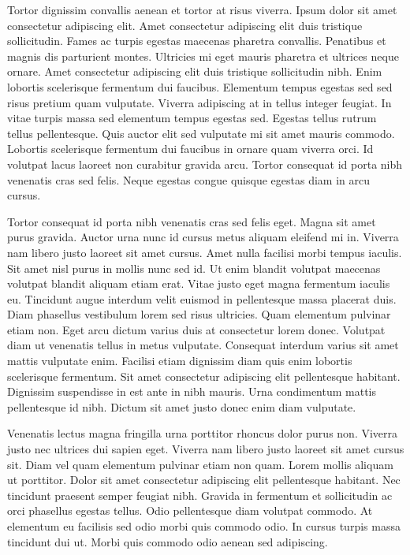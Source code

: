 \documentclass[11pt,a4paper]{article}
\begin{document}
Tortor dignissim convallis aenean et tortor at risus viverra. Ipsum dolor sit amet consectetur adipiscing elit. Amet consectetur adipiscing elit duis tristique sollicitudin. Fames ac turpis egestas maecenas pharetra convallis. Penatibus et magnis dis parturient montes. Ultricies mi eget mauris pharetra et ultrices neque ornare. Amet consectetur adipiscing elit duis tristique sollicitudin nibh. Enim lobortis scelerisque fermentum dui faucibus. Elementum tempus egestas sed sed risus pretium quam vulputate. Viverra adipiscing at in tellus integer feugiat. In vitae turpis massa sed elementum tempus egestas sed. Egestas tellus rutrum tellus pellentesque. Quis auctor elit sed vulputate mi sit amet mauris commodo. Lobortis scelerisque fermentum dui faucibus in ornare quam viverra orci. Id volutpat lacus laoreet non curabitur gravida arcu. Tortor consequat id porta nibh venenatis cras sed felis. Neque egestas congue quisque egestas diam in arcu cursus.

Tortor consequat id porta nibh venenatis cras sed felis eget. Magna sit amet purus gravida. Auctor urna nunc id cursus metus aliquam eleifend mi in. Viverra nam libero justo laoreet sit amet cursus. Amet nulla facilisi morbi tempus iaculis. Sit amet nisl purus in mollis nunc sed id. Ut enim blandit volutpat maecenas volutpat blandit aliquam etiam erat. Vitae justo eget magna fermentum iaculis eu. Tincidunt augue interdum velit euismod in pellentesque massa placerat duis. Diam phasellus vestibulum lorem sed risus ultricies. Quam elementum pulvinar etiam non. Eget arcu dictum varius duis at consectetur lorem donec. Volutpat diam ut venenatis tellus in metus vulputate. Consequat interdum varius sit amet mattis vulputate enim. Facilisi etiam dignissim diam quis enim lobortis scelerisque fermentum. Sit amet consectetur adipiscing elit pellentesque habitant. Dignissim suspendisse in est ante in nibh mauris. Urna condimentum mattis pellentesque id nibh. Dictum sit amet justo donec enim diam vulputate.

Venenatis lectus magna fringilla urna porttitor rhoncus dolor purus non. Viverra justo nec ultrices dui sapien eget. Viverra nam libero justo laoreet sit amet cursus sit. Diam vel quam elementum pulvinar etiam non quam. Lorem mollis aliquam ut porttitor. Dolor sit amet consectetur adipiscing elit pellentesque habitant. Nec tincidunt praesent semper feugiat nibh. Gravida in fermentum et sollicitudin ac orci phasellus egestas tellus. Odio pellentesque diam volutpat commodo. At elementum eu facilisis sed odio morbi quis commodo odio. In cursus turpis massa tincidunt dui ut. Morbi quis commodo odio aenean sed adipiscing.
\end{document}
